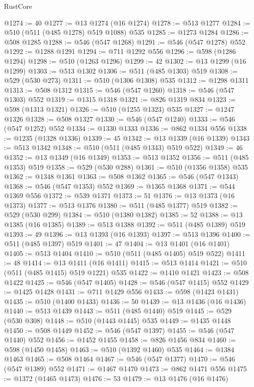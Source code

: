 \begin{lexlean}{RustCore}
\begin{coremodule}
@1274 := 40
@1277 := @13 @1274 (@16 @1274)
@1278 := @513 @1277
@1284 := @510 (@511 (@485 @1278) @519 @1088) @535
@1285 := @1273 @1284
@1286 := @508 @1285
@1288 := @546 (@547 @1268)
@1291 := @546 (@547 @1278) @552
@1292 := @1288 @1291
@1294 := @711 @1292 @556
@1296 := @598 (@1286 @1294)
@1298 := @510 (@1263 @1296)
@1299 := 42
@1302 := @13 @1299 (@16 @1299)
@1303 := @513 @1302
@1306 := @511 (@485 @1303) @519
@1308 := @529 (@530 @273)
@1311 := @510 (@1306 @1308) @535
@1312 := @1298 @1311
@1313 := @508 @1312
@1315 := @546 (@547 @1260)
@1318 := @546 (@547 @1303) @552
@1319 := @1315 @1318
@1321 := @826 @1319 @834
@1323 := @598 (@1313 @1321)
@1326 := @510 (@1255 @1323) @535
@1327 := @1247 @1326
@1328 := @508 @1327
@1330 := @546 (@547 @1240)
@1333 := @546 (@547 @1252) @552
@1334 := @1330 @1333
@1336 := @862 @1334 @556
@1338 := @1235 (@1328 @1336)
@1339 := 45
@1342 := @13 @1339 (@16 @1339)
@1343 := @513 @1342
@1348 := @510 (@511 (@485 @1343) @519 @522)
@1349 := 46
@1352 := @13 @1349 (@16 @1349)
@1353 := @513 @1352
@1356 := @511 (@485 @1353) @519
@1358 := @529 (@530 @288)
@1361 := @510 (@1356 @1358) @535
@1362 := @1348 @1361
@1363 := @508 @1362
@1365 := @546 (@547 @1343)
@1368 := @546 (@547 @1353) @552
@1369 := @1365 @1368
@1371 := @544 @1369 @556
@1372 := @539 @1371
@1373 := 51
@1376 := @13 @1373 (@16 @1373)
@1377 := @513 @1376
@1380 := @511 (@485 @1377) @519
@1382 := @529 (@530 @299)
@1384 := @510 (@1380 @1382)
@1385 := 52
@1388 := @13 @1385 (@16 @1385)
@1389 := @513 @1388
@1392 := @511 (@485 @1389) @519
@1393 := 49
@1396 := @13 @1393 (@16 @1393)
@1397 := @513 @1396
@1400 := @511 (@485 @1397) @519
@1401 := 47
@1404 := @13 @1401 (@16 @1401)
@1405 := @513 @1404
@1410 := @510 (@511 (@485 @1405) @519 @522)
@1411 := 48
@1414 := @13 @1411 (@16 @1411)
@1415 := @513 @1414
@1421 := @510 (@511 (@485 @1415) @519 @1221) @535
@1422 := @1410 @1421
@1423 := @508 @1422
@1425 := @546 (@547 @1405)
@1428 := @546 (@547 @1415) @552
@1429 := @1425 @1428
@1431 := @711 @1429 @556
@1433 := @598 (@1423 @1431)
@1435 := @510 (@1400 @1433)
@1436 := 50
@1439 := @13 @1436 (@16 @1436)
@1440 := @513 @1439
@1443 := @511 (@485 @1440) @519
@1445 := @529 (@530 @308)
@1448 := @510 (@1443 @1445) @535
@1449 := @1435 @1448
@1450 := @508 @1449
@1452 := @546 (@547 @1397)
@1455 := @546 (@547 @1440) @552
@1456 := @1452 @1455
@1458 := @826 @1456 @834
@1460 := @598 (@1450 @1458)
@1463 := @510 (@1392 @1460) @535
@1464 := @1384 @1463
@1465 := @508 @1464
@1467 := @546 (@547 @1377)
@1470 := @546 (@547 @1389) @552
@1471 := @1467 @1470
@1473 := @862 @1471 @556
@1475 := @1372 (@1465 @1473)
@1476 := 53
@1479 := @13 @1476 (@16 @1476)

\end{coremodule}
\end{lexlean}
